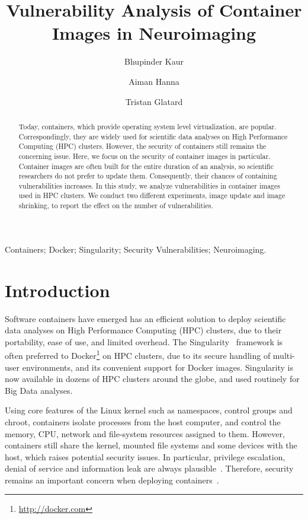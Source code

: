 \documentclass[a4paper,num-refs]{oup-contemporary}
\title{Vulnerability Analysis of Container Images in Neuroimaging}
\begin{document}
\author[1]{Bhupinder Kaur}
\author[1]{Aiman Hanna}
\author[1]{Tristan Glatard}


\maketitle

\begin{abstract}

Today, containers, which provide operating system level virtualization, are
popular. Correspondingly, they are widely used for scientific data analyses on 
High Performance Computing (HPC) clusters. However, the security of containers
still remains the concerning issue. Here, we focus on the security of container
images in particular. Container images are often built for the entire
duration of an analysis, so scientific researchers do not prefer to update
them. Consequently, their chances of containing vulnerabilities increases.  
In this study, we analyze vulnerabilities in container images used in 
HPC clusters.
We conduct two different
experiments, image update and image shrinking, to report the effect 
on the number of vulnerabilities.

\end{abstract}

\begin{keywords}
Containers; Docker; Singularity; Security Vulnerabilities; Neuroimaging.
\end{keywords}


\section{Introduction}

Software containers have emerged has an efficient solution to deploy
scientific data analyses on High Performance Computing (HPC) clusters, due
to their portability, ease of use, and limited overhead. The
Singularity~\cite{kurtzer2017singularity} framework is often preferred to
Docker\footnote{\url{http://docker.com}} on HPC clusters, due to its
secure handling of multi-user environments, and its convenient support for
Docker images. Singularity is now available in dozens of HPC
clusters around the globe, and used routinely for Big Data analyses.

Using core features of the Linux kernel such as namespaces, control groups
and chroot, containers isolate processes from the
host computer,  
and control the memory, CPU, network and file-system resources assigned to
them. However, containers still share the kernel, mounted file systems and
some devices with the host, which raises potential security issues. In
particular, privilege escalation, denial of service and information leak
are always plausible~\cite{gantikow2016providing}. Therefore, security remains 
an important concern when deploying containers~\cite{bettini2015vulnerability}.
\end{document}
